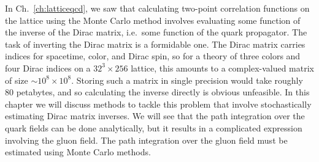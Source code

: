 In Ch.~\ref{ch:latticeqcd}, we saw that calculating two-point correlation functions on the lattice using the Monte Carlo method involves evaluating some function of the inverse of the Dirac matrix, i.e.\ some function of the quark propagator. The task of inverting the Dirac matrix is a formidable one. The Dirac matrix carries indices for spacetime, color, and Dirac spin, so for a theory of three colors and four Dirac indices on a $32^3\times 256$ lattice, this amounts to a complex-valued matrix of size $\sim 10^8\times 10^8$. Storing such a matrix in single precision would take roughly 80 petabytes, and so calculating the inverse directly is obvious unfeasible. In this chapter we will discuss methods to tackle this problem that involve stochastically estimating Dirac matrix inverses. We will see that the path integration over the quark fields can be done analytically, but it results in a complicated expression involving the gluon field. The path integration over the gluon field must be estimated using Monte Carlo methods.
